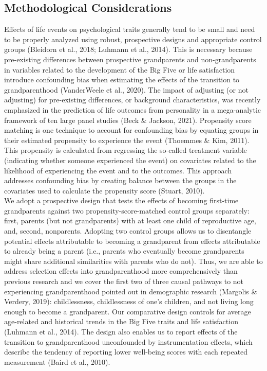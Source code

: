 \documentclass[
  english,
  man,floatsintext]{apa7}
\begin{document}
\hypertarget{methodological-considerations}{%
\subsection{Methodological Considerations}\label{methodological-considerations}}

Effects of life events on psychological traits generally tend to be small and need to be properly analyzed using robust, prospective designs and appropriate control groups (Bleidorn et al., 2018; Luhmann et al., 2014). This is necessary because pre-existing differences between prospective grandparents and non-grandparents in variables related to the development of the Big Five or life satisfaction introduce confounding bias when estimating the effects of the transition to grandparenthood (VanderWeele et al., 2020). The impact of adjusting (or not adjusting) for pre-existing differences, or background characteristics, was recently emphasized in the prediction of life outcomes from personality in a mega-analytic framework of ten large panel studies (Beck \& Jackson, 2021). Propensity score matching is one technique to account for confounding bias by equating groups in their estimated propensity to experience the event (Thoemmes \& Kim, 2011). This propensity is calculated from regressing the so-called treatment variable (indicating whether someone experienced the event) on covariates related to the likelihood of experiencing the event and to the outcomes. This approach addresses confounding bias by creating balance between the groups in the covariates used to calculate the propensity score (Stuart, 2010).\\
We adopt a prospective design that tests the effects of becoming first-time grandparents against two propensity-score-matched control groups separately: first, parents (but not grandparents) with at least one child of reproductive age, and, second, nonparents. Adopting two control groups allows us to disentangle potential effects attributable to becoming a grandparent from effects attributable to already being a parent (i.e., parents who eventually become grandparents might share additional similarities with parents who do not). Thus, we are able to address selection effects into grandparenthood more comprehensively than previous research and we cover the first two of three causal pathways to not experiencing grandparenthood pointed out in demographic research (Margolis \& Verdery, 2019): childlessness, childlessness of one's children, and not living long enough to become a grandparent. Our comparative design controls for average age-related and historical trends in the Big Five traits and life satisfaction (Luhmann et al., 2014). The design also enables us to report effects of the transition to grandparenthood unconfounded by instrumentation effects, which describe the tendency of reporting lower well-being scores with each repeated measurement (Baird et al., 2010).\\
\end{document}
